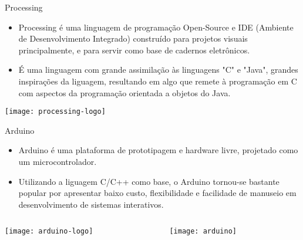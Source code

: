 \begin{frame}[c]{Processing}
 
    \begin{itemize}
        \item Processing é uma linguagem de programação Open-Source e IDE (Ambiente de Desenvolvimento Integrado) construído para projetos visuais principalmente, e para servir como base de cadernos eletrônicos.
        \item É uma linguagem com grande assimilação às linguagens "C" e "Java", grandes inspirações da liguagem, resultando em algo que remete à programação em C com aspectos da programação orientada a objetos do Java.
    \end{itemize}
	\vspace{0.4cm}
	\centering
	\texttt{[image: processing-logo]}   

\end{frame}
\begin{frame}[t]{Arduino}
    
  \begin{itemize}
        \item Arduino é uma plataforma de prototipagem e hardware livre, projetado como um microcontrolador.
        \item Utilizando a liguagem C/C++ como base, o Arduino tornou-se bastante popular por apresentar baixo custo, flexibilidade e facilidade de manuseio em desenvolvimento de sistemas interativos.
    \end{itemize}
\vspace{0.3cm}
\begin{columns}
	\begin{column}{0.4\textwidth}
        	\centering
		\texttt{[image: arduino-logo]} 
	\end{column}
		\begin{column}{0.4\textwidth}
		\centering
       	\texttt{[image: arduino]} 
	\end{column}
\end{columns}


\end{frame}
